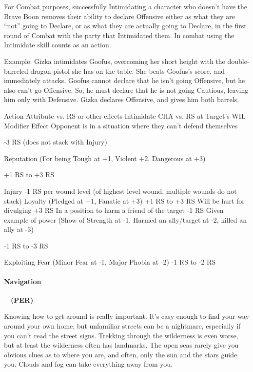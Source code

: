 \documentclass[oneside,11pt,english]{book}
\begin{document}
For Combat purposes, successfully Intimidating a character who doesn’t have the Brave Boon removes their ability to declare Offensive either as what they are “not” going to Declare, or as what they are actually going to Declare, in the first round of Combat with the party that Intimidated them. In combat using the Intimidate skill counts as an action.


Example: Gizka intimidates Goofus, overcoming her short height with the double-barreled dragon pistol she has on the table. She beats Goofus’s score, and immediately attacks. Goofus cannot declare that he isn’t going Offensive, but he also can’t go Offensive. So, he must declare that he is not going Cautious, leaving him only with Defensive. Gizka declares Offensive, and gives him both barrels.


Action Attribute vs. RS or other effects 
Intimidate CHA vs. RS at Target’s WIL 
Modifier Effect 
Opponent is in a situation where they can’t defend 
themselves 

-3 RS (does not stack with Injury) 

Reputation (For being Tough at +1, Violent +2, 
Dangerous at +3) 

+1 RS to +3 RS 

Injury -1 RS per wound level (of highest level 
wound, multiple wounds do not stack) 
Loyalty (Pledged at +1, Fanatic at +3) +1 RS to +3 RS 
Will be hurt for divulging +3 RS 
In a position to harm a friend of the target -1 RS 
Given example of power (Show of Strength at -1, 
Harmed an ally/target at -2, killed an ally at -3) 

-1 RS to -3 RS 

Exploiting Fear (Minor Fear at -1, Major Phobia at -2) -1 RS to -2 RS 

 

 

\paragraph{\label{skill:Navigation}Navigation}---\quad\textbf{(PER) }\par
Knowing how to get around is really important. It’s easy enough to find your way around your own home, but unfamiliar streets can be a nightmare, especially if you can’t read the street signs. Trekking through the wilderness is even worse, but at least the wilderness often has landmarks. The open seas rarely give you obvious clues as to where you are, and often, only the sun and the stars guide you. Clouds and fog can take everything away from you.
\end{document}
